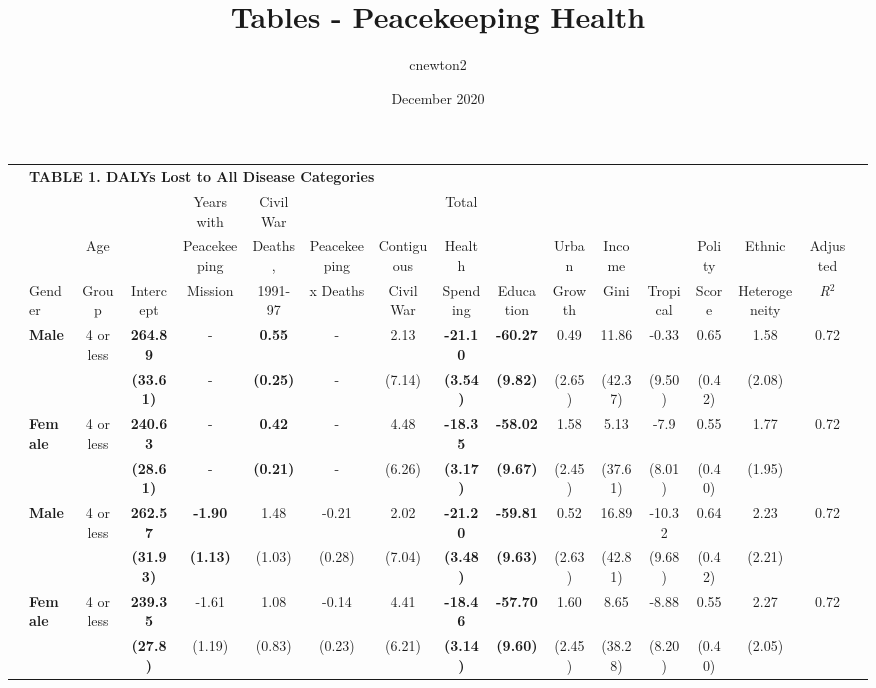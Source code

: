 \documentclass{article}
\title{Tables - Peacekeeping Health}
\author{cnewton2 }
\date{December 2020}
\begin{document}
\begin{table}[!htbp] \centering 
\begin{tabular}{@{\extracolsep{.05pt}}|clccccccccccccccc|} 
\hline

& \multicolumn{10}{l}{\textbf{TABLE 1. DALYs Lost to All Disease Categories}} &&&&&&\\
\cline{2-16}
& & & & Years with & Civil War & & & Total & & & & & & & & \\
& & Age & & Peacekeeping & Deaths, & Peacekeeping & Contiguous & Health & & Urban & Income & & Polity & Ethnic & Adjusted & \\
& Gender & Group & Intercept & Mission & 1991-97 & x Deaths & Civil War & Spending & Education &  Growth &  Gini & Tropical & Score & Heterogeneity & \textit{R$^2$} & \\
\cline{2-16} 
& \textbf{Male} & 4 or less & \textbf{264.89} & - & \textbf{0.55} & - & 2.13 & \textbf{-21.10} & \textbf{-60.27} & 0.49 & 11.86 & -0.33 & 0.65 & 1.58 & 0.72 & \\
& & & \textbf{(33.61)} & - & \textbf{(0.25)} & - & (7.14) & \textbf{(3.54)} & \textbf{(9.82)} & (2.65) & (42.37) & (9.50) & (0.42) & (2.08) & & \\
& \textbf{Female} & 4 or less & \textbf{240.63} & - & \textbf{0.42} & - & 4.48 & \textbf{-18.35} & \textbf{-58.02} & 1.58 & 5.13 & -7.9 & 0.55 & 1.77 & 0.72 & \\
&  & & \textbf{(28.61)} & - & \textbf{(0.21)} & - & (6.26) & \textbf{(3.17)} & \textbf{(9.67)} & (2.45) & (37.61) & (8.01) & (0.40) & (1.95) & & \\
& \textbf{Male} & 4 or less & \textbf{262.57} & \textbf{-1.90} & 1.48 & -0.21 & 2.02 & \textbf{-21.20} & \textbf{-59.81} & 0.52 & 16.89 & -10.32 & 0.64 & 2.23 & 0.72 & \\
&  & & \textbf{(31.93)} & \textbf{(1.13)} & (1.03) & (0.28) & (7.04) & \textbf{(3.48)} & \textbf{(9.63)} & (2.63) & (42.81) & (9.68) & (0.42) & (2.21) & & \\
& \textbf{Female} & 4 or less & \textbf{239.35} & -1.61 & 1.08 & -0.14 & 4.41 & \textbf{-18.46} & \textbf{-57.70} & 1.60 & 8.65 & -8.88 & 0.55 & 2.27 & 0.72 & \\
&  & & \textbf{(27.8)} & (1.19) & (0.83) & (0.23) & (6.21) & \textbf{(3.14)} & \textbf{(9.60)} & (2.45) & (38.28) & (8.20) & (0.40) & (2.05) & & \\

\end{tabular}
\end{table}
\end{document}
